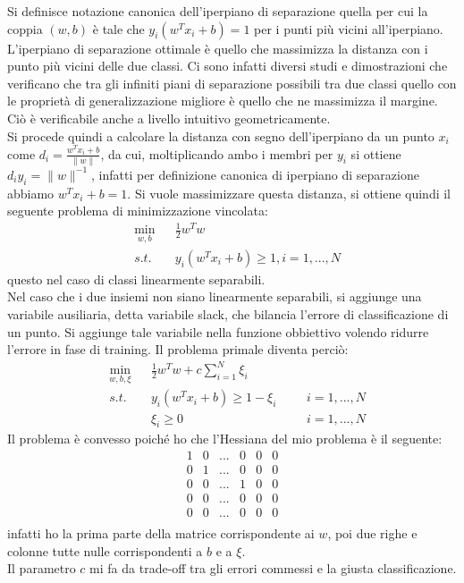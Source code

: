 \documentclass{report}
\begin{document}
Si definisce notazione canonica dell'iperpiano di separazione quella per cui la coppia $(w, b)$ è tale che $y_i (w^Tx_i+b) = 1$ per i punti più vicini all'iperpiano.\\
L'iperpiano di separazione ottimale è quello che massimizza la distanza con i punto più vicini delle due classi. Ci sono infatti diversi studi e dimostrazioni che verificano che tra gli infiniti piani di separazione possibili tra due classi quello con le proprietà di generalizzazione migliore è quello che ne massimizza il margine. Ciò è verificabile anche a livello intuitivo geometricamente. \\Si procede quindi a calcolare la distanza con segno dell'iperpiano da un punto $x_i$ come $d_i =\frac{w^T x_i + b}{\|w\|}$, da cui, moltiplicando ambo i membri per $y_i$ si ottiene $d_i y_i = \|w\|^{-1}$, infatti per definizione canonica di iperpiano di separazione abbiamo $w^T x_i + b= 1$. Si vuole massimizzare questa distanza, si ottiene quindi il seguente problema di minimizzazione vincolata:
\begin{equation} 
	\begin{aligned}
	& \min_{w, b} 
	& & \frac{1}{2}w^T w\\
	& s.t. 
	& & y_i (w^Tx_i+b) \geqslant 1 , i= 1,...,N
	\end{aligned}
\end{equation}
questo nel caso di classi linearmente separabili.\\

Nel caso che i due insiemi non siano linearmente separabili, si aggiunge una variabile ausiliaria, detta variabile slack, che bilancia l'errore di classificazione di un punto. Si aggiunge tale variabile nella funzione obbiettivo volendo ridurre l'errore in fase di training. Il problema primale diventa perciò:
\begin{equation} \label{primale}
	\begin{aligned}
	& \min_{w, b, \xi} 
	& & \frac{1}{2}w^T w + c \sum_{i = 1}^{N}{\xi_i}\\
	& s.t. 
	& & y_i (w^Tx_i+b) \geqslant 1 - \xi_i 
	& & & i= 1,...,N\\
	&
	& & \xi_i \geqslant 0
	& & & i= 1,...,N
	\end{aligned}
\end{equation}
Il problema è convesso poiché ho che l'Hessiana del mio problema è il seguente:\\
\[
 \begin{matrix}
  1 & 0 & ... & 0 & 0 & 0 \\
  0 & 1 & ... & 0 & 0 & 0 \\
  0 & 0 & ... & 1 & 0 & 0 \\
  0 & 0 & ... & 0 & 0 & 0 \\
  0 & 0 & ... & 0 & 0 & 0 \\
 \end{matrix}
\]
infatti ho la prima parte della matrice corrispondente ai $w$, poi due righe e colonne tutte nulle corrispondenti a $b$ e a $\xi$.\\
Il parametro $c$ mi fa da trade-off tra gli errori commessi e la giusta classificazione.\\
\end{document}
